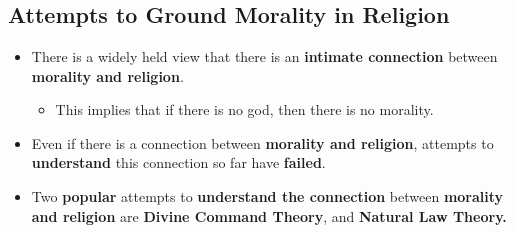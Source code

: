 \documentclass{article}
\begin{document}
    \section*{}

    \subsection*{Attempts to Ground Morality in Religion}
    \begin{itemize}
        \item There is a widely held view that there is an \textbf{intimate connection} between \textbf{morality and religion}.
        \begin{itemize}
            \item This implies that if there is no god, then there is no morality.
        \end{itemize}
        \item Even if there is a connection between \textbf{morality and religion}, attempts to \textbf{understand} this connection so far have \textbf{failed}.
        \item Two \textbf{popular} attempts to \textbf{understand the connection} between \textbf{morality and religion} are \textbf{Divine Command Theory}, and \textbf{Natural Law Theory.}
    \end{itemize}
\end{document}
